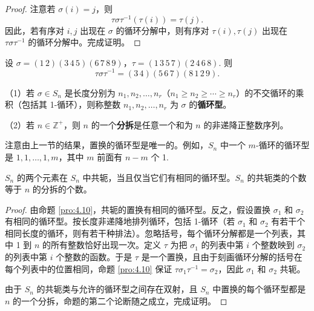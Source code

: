 \begin{proof}
注意若 \(\sigma(i) = j\)，则
\[
\tau\sigma\tau^{-1}(\tau(i)) = \tau(j).
\]
因此，若有序对 \(i, j\) 出现在 \(\sigma\) 的循环分解中，则有序对 \(\tau(i), \tau(j)\) 出现在 \(\tau\sigma\tau^{-1}\) 的循环分解中。完成证明。
\end{proof}

\begin{example}
设 \(\sigma = (1\,2)(3\,4\,5)(6\,7\,8\,9)\)，\(\tau = (1\,3\,5\,7)(2\,4\,6\,8)\). 则
\[
\tau\sigma\tau^{-1} = (3\,4)(5\,6\,7)(8\,1\,2\,9).
\]
\end{example}

\begin{definition}
（1）若 \(\sigma \in S_n\) 是长度分别为 \(n_1, n_2, \ldots, n_r\)（\(n_1 \geq n_2 \geq \cdots \geq n_r\)）的不交循环的乘积（包括其 1-循环），则称整数 \(n_1, n_2, \ldots, n_r\) 为 \(\sigma\) 的\textbf{循环型}。

（2）若 \(n \in \mathbb{Z}^+\)，则 \(n\) 的一个\textbf{分拆}是任意一个和为 \(n\) 的非递降正整数序列。
\end{definition}

注意由上一节的结果，置换的循环型是唯一的。例如，\(S_n\) 中一个 \(m\)-循环的循环型是 \(1, 1, \ldots, 1, m\)，其中 \(m\) 前面有 \(n-m\) 个 1.

\begin{proposition}\label{pro:4.11}
\(S_n\) 的两个元素在 \(S_n\) 中共轭，当且仅当它们有相同的循环型。\(S_n\) 的共轭类的个数等于 \(n\) 的分拆的个数。
\end{proposition}

\begin{proof}
由命题 \ref{pro:4.10}，共轭的置换有相同的循环型。反之，假设置换 \(\sigma_1\) 和 \(\sigma_2\) 有相同的循环型。按长度非递降地排列循环，包括 1-循环（若 \(\sigma_1\) 和 \(\sigma_2\) 有若干个相同长度的循环，则有若干种排法）。忽略括号，每个循环分解都是一个列表，其中 1 到 \(n\) 的所有整数恰好出现一次。定义 \(\tau\) 为把 \(\sigma_1\) 的列表中第 \(i\) 个整数映到 \(\sigma_2\) 的列表中第 \(i\) 个整数的函数。于是 \(\tau\) 是一个置换，且由于刻画循环分解的括号在每个列表中的位置相同，命题 \ref{pro:4.10} 保证 \(\tau\sigma_1\tau^{-1} = \sigma_2\)，因此 \(\sigma_1\) 和 \(\sigma_2\) 共轭。

由于 \(S_n\) 的共轭类与允许的循环型之间存在双射，且 \(S_n\) 中置换的每个循环型都是 \(n\) 的一个分拆，命题的第二个论断随之成立，完成证明。
\end{proof}

